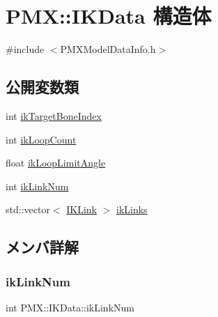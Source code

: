 \hypertarget{struct_p_m_x_1_1_i_k_data}{}\section{P\+MX\+:\+:I\+K\+Data 構造体}
\label{struct_p_m_x_1_1_i_k_data}


{\ttfamily \#include $<$P\+M\+X\+Model\+Data\+Info.\+h$>$}

\subsection*{公開変数類}
\begin{DoxyCompactItemize}
\item 
int \mbox{\hyperlink{struct_p_m_x_1_1_i_k_data_a5cfd439503ff768999f710e2e16fda99}{ik\+Target\+Bone\+Index}}
\item 
int \mbox{\hyperlink{struct_p_m_x_1_1_i_k_data_a2eae80c3c3fe9ef9eea5345a97c96277}{ik\+Loop\+Count}}
\item 
float \mbox{\hyperlink{struct_p_m_x_1_1_i_k_data_a05a2ab50184bc52be4e0f3c03cd4f7ff}{ik\+Loop\+Limit\+Angle}}
\item 
int \mbox{\hyperlink{struct_p_m_x_1_1_i_k_data_a58a9ad95d525dc2aa696238ae14ebc58}{ik\+Link\+Num}}
\item 
std\+::vector$<$ \mbox{\hyperlink{struct_p_m_x_1_1_i_k_link}{I\+K\+Link}} $>$ \mbox{\hyperlink{struct_p_m_x_1_1_i_k_data_acc8fb8ad47d0bfe6602f5bf601c92731}{ik\+Links}}
\end{DoxyCompactItemize}


\subsection{メンバ詳解}
\mbox{\label{struct_p_m_x_1_1_i_k_data_a58a9ad95d525dc2aa696238ae14ebc58}} 
\subsubsection{\texorpdfstring{ik\+Link\+Num}{ikLinkNum}}
{\footnotesize\ttfamily int P\+M\+X\+::\+I\+K\+Data\+::ik\+Link\+Num}

\mbox{\label{struct_p_m_x_1_1_i_k_data_acc8fb8ad47d0bfe6602f5bf601c92731}} 
